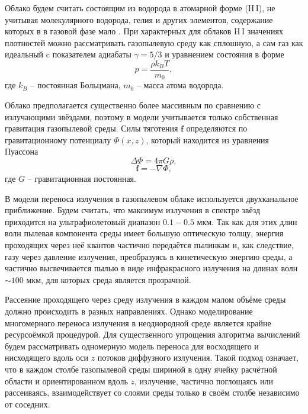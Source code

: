 \documentclass[a4paper,11pt,twoside]{article}
\begin{document}
Облако будем считать состоящим из водорода в атомарной форме (H\,I), не учитывая молекулярного водорода, гелия и других элементов, содержание которых в в газовой фазе мало \cite{Snow2006}. При характерных для облаков H\,I значениях плотностей можно рассматривать газопылевую среду как сплошную, а сам газ как идеальный c показателем адиабаты $\gamma = 5/3$ и уравнением состояния в форме
\begin{equation}\label{eq_gas_5}
p = \frac{\rho k_{B} T}{m_0},
\end{equation}
где $k_{B}$ -- постоянная Больцмана, $m_0$ -- масса атома водорода.

Облако предполагается существенно более массивным по сравнению
с излучающими звёздами, поэтому в модели учитывается только собственная гравитация газопылевой среды. Силы тяготения $\mathbf{f}$ определяются по гравитационному потенциалу $\Phi(x, z)$, который находится из уравнения Пуассона
\begin{equation}\label{eq_grav_1}
\Delta\Phi = 4\pi G \rho,
\end{equation}
\begin{equation}\label{eq_grav_2}
\mathbf{f} = -\nabla\Phi,
\end{equation}
где $G$ -- гравитационная постоянная.

В модели переноса излучения в газопылевом облаке используется двухканальное приближение. Будем считать, что максимум излучения в спектре звёзд приходится на ультрафиолетовый диапазон $0.1-0.5$ мкм. Так как для этих длин волн пылевая компонента среды имеет большую оптическую толщу, энергия проходящих через неё квантов частично передаётся пылинкам и, как следствие, газу через давление излучения, преобразуясь в кинетическую энергию среды, а частично высвечивается пылью в виде инфракрасного излучения на длинах волн $\sim 100$ мкм, для которых среда является прозрачной.

Рассеяние проходящего через среду излучения в каждом малом объёме среды должно происходить в разных направлениях. Однако моделирование многомерного переноса излучения в неоднородной среде является крайне ресурсоёмкой процедурой.
Для существенного упрощения алгоритма вычислений будем рассматривать одномерную модель переноса для восходящего и нисходящего вдоль оси $z$ потоков диффузного излучения. Такой подход означает, что в каждом столбе газопылевой среды шириной в одну ячейку расчётной области и ориентированном вдоль $z$, излучение, частично поглощаясь или рассеиваясь, взаимодействует со слоями среды только в своём столбе независимо от соседних.
\end{document}
